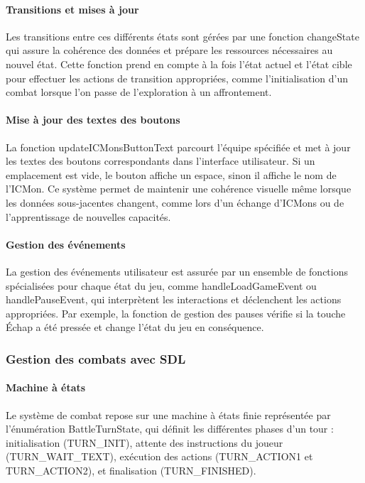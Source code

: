 \documentclass[12pt,a4paper, twoside]{article}
\begin{document}
\paragraph{Transitions et mises à jour} Les transitions entre ces différents états sont gérées par une fonction changeState qui assure la cohérence des données et prépare les ressources nécessaires au nouvel état. Cette fonction prend en compte à la fois l'état actuel et l'état cible pour effectuer les actions de transition appropriées, comme l'initialisation d'un combat lorsque l'on passe de l'exploration à un affrontement.

\paragraph{Mise à jour des textes des boutons} La fonction updateICMonsButtonText parcourt l'équipe spécifiée et met à jour les textes des boutons correspondants dans l'interface utilisateur. Si un emplacement est vide, le bouton affiche un espace, sinon il affiche le nom de l'ICMon. Ce système permet de maintenir une cohérence visuelle même lorsque les données sous-jacentes changent, comme lors d'un échange d'ICMons ou de l'apprentissage de nouvelles capacités.

\paragraph{Gestion des événements} La gestion des événements utilisateur est assurée par un ensemble de fonctions spécialisées pour chaque état du jeu, comme handleLoadGameEvent ou handlePauseEvent, qui interprètent les interactions et déclenchent les actions appropriées. Par exemple, la fonction de gestion des pauses vérifie si la touche Échap a été pressée et change l'état du jeu en conséquence.

\subsubsection{Gestion des combats avec SDL}
\paragraph{Machine à états} Le système de combat repose sur une machine à états finie représentée par l'énumération BattleTurnState, qui définit les différentes phases d'un tour : initialisation (TURN\_INIT), attente des instructions du joueur (TURN\_WAIT\_TEXT), exécution des actions (TURN\_ACTION1 et TURN\_ACTION2), et finalisation (TURN\_FINISHED).
\end{document}
